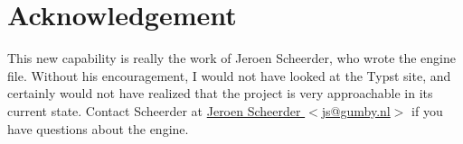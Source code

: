 \documentclass[11pt, oneside]{article}   	%
\begin{document}
\section{Acknowledgement}

This new capability is really the work of Jeroen Scheerder, who wrote the engine file. Without his encouragement, I would not have  looked at the Typst site,  and certainly would not have realized that the project is very approachable in its current state. Contact Scheerder at \href{mailto:js@gumby.nl}{Jeroen Scheerder $<$js@gumby.nl$>$} if you have questions about the engine.

%
%
%
%
%
\end{document}
